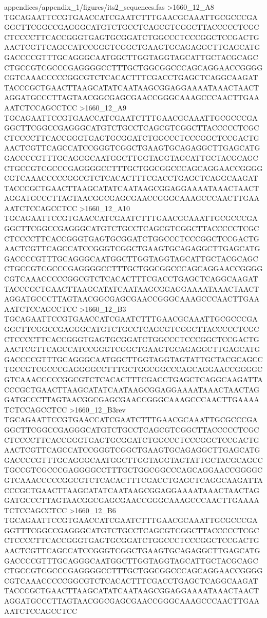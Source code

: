 {\begin{filecontents*}{appendices/appendix_1/figures/its2_sequences.fas}
>1660_12_A8
TGCAGAATTCCGTGAACCATCGAATCTTTGAACGCAAATTGCGCCCGAGGCTTCGGCCGAGGGCATGTCTGCCTCAGCGTCGGCTTACCCCCTCGCCTCCCCTTCACCGGGTGAGTGCGGATCTGGCCCTCCCGGCTCCGACTGAACTCGTTCAGCCATCCGGGTCGGCTGAAGTGCAGAGGCTTGAGCATGGACCCCGTTTGCAGGGCAATGGCTTGGTAGGTAGCATTGCTACGCAGCCTGCCGTCGCCCGAGGGGCCTTTGCTGGCGGCCCAGCAGGAACCGGGGCGTCAAACCCCCGGCGTCTCACACTTTCGACCTGAGCTCAGGCAAGATTACCCGCTGAACTTAAGCATATCAATAAGCGGAGGAAAATAAACTAACTAGGATGCCCTTAGTAACGGCGAGCGAACCGGGCAAAGCCCAACTTGAAAATCTCCAGCCTCC
>1660_12_A9
TGCAGAATTCCGTGAACCATCGAATCTTTGAACGCAAATTGCGCCCGAGGCTTCGGCCGAGGGCATGTCTGCCTCAGCGTCGGCTTACCCCCTCGCCTCCCCTTCACCGGGTGAGTGCGGATCTGGCCCTCCCGGCTCCGACTGAACTCGTTCAGCCATCCGGGTCGGCTGAAGTGCAGAGGCTTGAGCATGGACCCCGTTTGCAGGGCAATGGCTTGGTAGGTAGCATTGCTACGCAGCCTGCCGTCGCCCGAGGGGCCTTTGCTGGCGGCCCAGCAGGAACCGGGGCGTCAAACCCCCGGCGTCTCACACTTTCGACCTGAGCTCAGGCAAGATTACCCGCTGAACTTAAGCATATCAATAAGCGGAGGAAAATAAACTAACTAGGATGCCCTTAGTAACGGCGAGCGAACCGGGCAAAGCCCAACTTGAAAATCTCCAGCCTCC
>1660_12_A10
TGCAGAATTCCGTGAACCATCGAATCTTTGAACGCAAATTGCGCCCGAGGCTTCGGCCGAGGGCATGTCTGCCTCAGCGTCGGCTTACCCCCTCGCCTCCCCTTCACCGGGTGAGTGCGGATCTGGCCCTCCCGGCTCCGACTGAACTCGTTCAGCCATCCGGGTCGGCTGAAGTGCAGAGGCTTGAGCATGGACCCCGTTTGCAGGGCAATGGCTTGGTAGGTAGCATTGCTACGCAGCCTGCCGTCGCCCGAGGGGCCTTTGCTGGCGGCCCAGCAGGAACCGGGGCGTCAAACCCCCGGCGTCTCACACTTTCGACCTGAGCTCAGGCAAGATTACCCGCTGAACTTAAGCATATCAATAAGCGGAGGAAAATAAACTAACTAGGATGCCCTTAGTAACGGCGAGCGAACCGGGCAAAGCCCAACTTGAAAATCTCCAGCCTCC
>1660_12_B3
TGCAGAATTCCGTGAACCATCGAATCTTTGAACGCAAATTGCGCCCGAGGCTTCGGCCGAGGGCATGTCTGCCTCAGCGTCGGCTTACCCCCTCGCCTCCCCTTCACCGGGTGAGTGCGGATCTGGCCCTCCCGGCTCCGACTGAACTCGTTCAGCCATCCGGGTCGGCTGAAGTGCAGAGGCTTGAGCATGGACCCCGTTTGCAGGGCAATGGCTTGGTAGGTAGTATTGCTACGCAGCCTGCCGTCGCCCGAGGGGCCTTTGCTGGCGGCCCAGCAGGAACCGGGGCGTCAAACCCCCGGCGTCTCACACTTTCGACCTGAGCTCAGGCAAGATTACCCGCTGAACTTAAGCATATCAATAAGCGGAGGAAAATAAACTAACTAGGATGCCCTTAGTAACGGCGAGCGAACCGGGCAAAGCCCAACTTGAAAATCTCCAGCCTCC
>1660_12_B3rev
TGCAGAATTCCGTGAACCATCGAATCTTTGAACGCAAATTGCGCCCGAGGCTTCGGCCGAGGGCATGTCTGCCTCAGCGTCGGCTTACCCCCTCGCCTCCCCTTCACCGGGTGAGTGCGGATCTGGCCCTCCCGGCTCCGACTGAACTCGTTCAGCCATCCGGGTCGGCTGAAGTGCAGAGGCTTGAGCATGGACCCCGTTTGCAGGGCAATGGCTTGGTAGGTAGTATTGCTACGCAGCCTGCCGTCGCCCGAGGGGCCTTTGCTGGCGGCCCAGCAGGAACCGGGGCGTCAAACCCCCGGCGTCTCACACTTTCGACCTGAGCTCAGGCAAGATTACCCGCTGAACTTAAGCATATCAATAAGCGGAGGAAAATAAACTAACTAGGATGCCCTTAGTAACGGCGAGCGAACCGGGCAAAGCCCAACTTGAAAATCTCCAGCCTCC
>1660_12_B6
TGCAGAATTCCGTGAACCATCGAATCTTTGAACGCAAATTGCGCCCGAGGTTTCGGCCGAGGGCATGTCTGCCTCAGCGTCGGCTTACCCCCTCGCCTCCCCTTCACCGGGTGAGTGCGGATCTGGCCCTCCCGGCTCCGACTGAACTCGTTCAGCCATCCGGGTCGGCTGAAGTGCAGAGGCTTGAGCATGGACCCCGTTTGCAGGGCAATGGCTTGGTAGGTAGCATTGCTACGCAGCCTGCCGTCGCCCGAGGGGCCTTTGCTGGCGGCCCAGCAGGAACCGGGGCGTCAAACCCCCGGCGTCTCACACTTTCGACCTGAGCTCAGGCAAGATTACCCGCTGAACTTAAGCATATCAATAAGCGGAGGAAAATAAACTAACTAGGATGCCCTTAGTAACGGCGAGCGAACCGGGCAAAGCCCAACTTGAAAATCTCCAGCCTCC

\end{filecontents*}}
